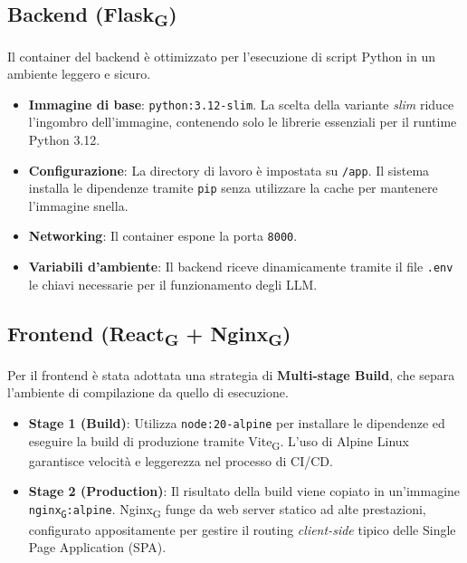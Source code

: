 \documentclass[11pt,a4paper]{article}
\newcommand{\gls}[1]{#1\textsubscript{G}}
\begin{document}
\subsection{Backend (\gls{Flask})}
Il container del backend è ottimizzato per l'esecuzione di script Python in un ambiente leggero e sicuro.
\begin{itemize}
    \item \textbf{Immagine di base}: \texttt{python:3.12-slim}. La scelta della variante \textit{slim} riduce l'ingombro dell'immagine, contenendo solo le librerie essenziali per il runtime Python 3.12.
    \item \textbf{Configurazione}: La directory di lavoro è impostata su \texttt{/app}. Il sistema installa le dipendenze tramite \texttt{pip} senza utilizzare la cache per mantenere l'immagine snella.
    \item \textbf{Networking}: Il container espone la porta \texttt{8000}.
    \item \textbf{Variabili d'ambiente}: Il backend riceve dinamicamente tramite il file \texttt{.env} le chiavi necessarie per il funzionamento degli LLM.
\end{itemize}

\subsection{Frontend (\gls{React} + \gls{Nginx})}
Per il frontend è stata adottata una strategia di \textbf{Multi-stage Build}, che separa l'ambiente di compilazione da quello di esecuzione.
\begin{itemize}
    \item \textbf{Stage 1 (Build)}: Utilizza \texttt{node:20-alpine} per installare le dipendenze ed eseguire la build di produzione tramite \gls{Vite}. L'uso di Alpine Linux garantisce velocità e leggerezza nel processo di CI/CD.
    \item \textbf{Stage 2 (Production)}: Il risultato della build viene copiato in un'immagine \texttt{\gls{nginx}:alpine}. \gls{Nginx} funge da web server statico ad alte prestazioni, configurato appositamente per gestire il routing \textit{client-side} tipico delle Single Page Application (SPA).
\end{itemize}
\end{document}
